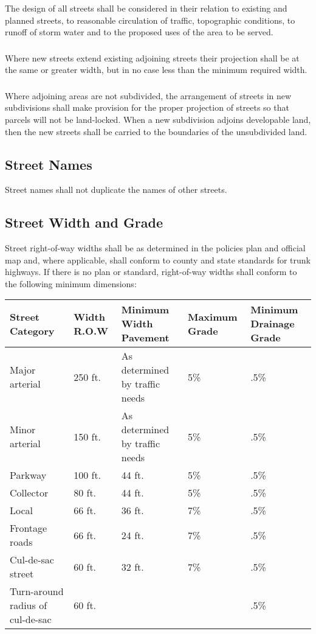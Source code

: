 \subsubsection{}
The design of all streets shall be considered in their relation to existing and planned streets, to reasonable circulation of traffic, topographic conditions, to runoff of storm water and to the proposed uses of the area to be served.
\subsubsection{}
Where new streets extend existing adjoining streets their projection shall be at the same or greater width, but in no case less than the minimum required width.
\subsubsection{}
Where adjoining areas are not subdivided, the arrangement of streets in new subdivisions shall make provision for the proper projection of streets so that parcels will not be land-locked.  When a new subdivision adjoins developable land, then the new streets shall be carried to the boundaries of the unsubdivided land.
\subsection{Street Names}
Street names shall not duplicate the names of other streets.
\subsection{Street Width and Grade}
Street right-of-way widths shall be as determined in the policies plan and official map and, where applicable, shall conform to county and state standards for trunk highways.  If there is no plan or standard, right-of-way widths shall conform to the following minimum dimensions:\\
\begin{center}
\begin{tabular}{|p{2.5cm}|p{2.5cm}|p{2.5cm}|p{2.5cm}|p{2.5cm}|}
    \hline
    \textbf{Street Category} & \textbf{Width R.O.W} & \textbf{Minimum Width Pavement} & \textbf{Maximum Grade} & \textbf{Minimum Drainage Grade}\\
    \hline
    Major arterial & 250 ft. & As determined by traffic needs & 5\% & .5\%\\
    \hline
    Minor arterial & 150 ft. & As determined by traffic needs & 5\% & .5\%\\
    \hline
    Parkway & 100 ft. & 44 ft. & 5\% &.5\%\\
    \hline
    Collector & 80 ft. & 44 ft. & 5\% & .5\%\\
    \hline
    Local & 66 ft. & 36 ft. & 7\% & .5\%\\
    \hline
    Frontage roads & 66 ft. & 24 ft. & 7\% & .5\%\\
    \hline
    Cul-de-sac street & 60 ft. & 32 ft. & 7\% & .5\%\\
    \hline
    Turn-around radius of cul-de-sac & 60 ft. & & & .5\%\\
    \hline
\end{tabular}
\end{center}
